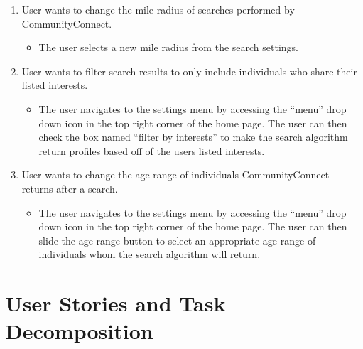 \documentclass[12pt]{article}
\begin{document}
\begin{enumerate}
    \item User wants to change the mile radius of searches performed by CommunityConnect.
      \begin{itemize}
        \item The user selects a new mile radius from the search settings.
      \end{itemize}

    \item  User wants to filter search results to only include individuals who share their listed interests.
      \begin{itemize}
        \item The user navigates to the settings menu by accessing the “menu” drop down icon in the top right corner of the home page. The user can then check the box named “filter by interests” to make the search algorithm return profiles based off of the users listed interests.
      \end{itemize}

    \item  User wants to change the age range of individuals CommunityConnect returns after a search.
      \begin{itemize}
        \item The user navigates to the settings menu by accessing the “menu” drop down icon in the top right corner of the home page. The user can then slide the age range button to select an appropriate age range of individuals whom the search algorithm will return.
      \end{itemize}

  \end{enumerate}

\section{\bf  User Stories and Task Decomposition}
\end{document}
